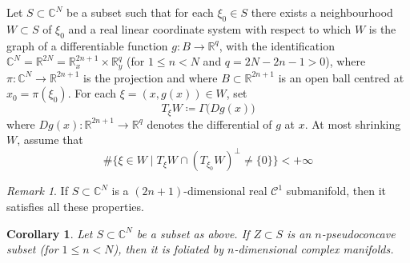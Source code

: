 \documentclass[reqno,oneside]{amsart}
\newcommand{\numberset}{\mathbb}
\newcommand{\R}{\numberset{R}}
\newcommand{\C}{\numberset{C}}
\theoremstyle{definition}
\theoremstyle{plain}
\newtheorem{corollary}[definition]{Corollary}
\theoremstyle{remark}
\newtheorem{remark}[definition]{Remark}
\begin{document}
Let $S\subset\C^N$ be a subset such that for each $\xi_0\in S$ there exists a neighbourhood $W\subset S$ of $\xi_0$ and a real linear coordinate system with respect to which $W$ is the graph of a differentiable function $g:B\to\R^q$, with the identification $\C^N=\R^{2N}=\R^{2n+1}_x\times\R^q_y$ (for $1\leq n<N$ and $q=2N-2n-1>0$), where $\pi:\C^N\to\R^{2n+1}$ is the projection and where $B\subset\R^{2n+1}$ is an open ball centred at $x_0=\pi(\xi_0)$. For each $\xi=(x,g(x))\in W$, set
\[
	T_\xi W\coloneqq\Gamma\bigl(Dg(x)\bigr)
\]
where $Dg(x):\R^{2n+1}\to\R^q$ denotes the differential of $g$ at $x$. At most shrinking $W$, assume that
\begin{equation}
\label{eq:perpendicular}
	\#\bigl\{\xi\in W \mid T_\xi W\cap(T_{\xi_0}W)^\perp\neq\{0\}\bigr\}<+\infty
\end{equation}
\begin{remark}
\label{rem:C1_submanifold}
	If $S\subset\C^N$ is a $(2n+1)$-dimensional real $\mathscr{C}^1$ submanifold, then it satisfies all these properties.
\end{remark}
\begin{corollary}
\label{coro:diff_function}
	Let $S\subset\C^N$ be a subset as above. If $Z\subset S$ is an $n$-pseudoconcave subset (for $1\leq n<N$), then it is foliated by $n$-dimensional complex manifolds.
\end{corollary}
\end{document}
